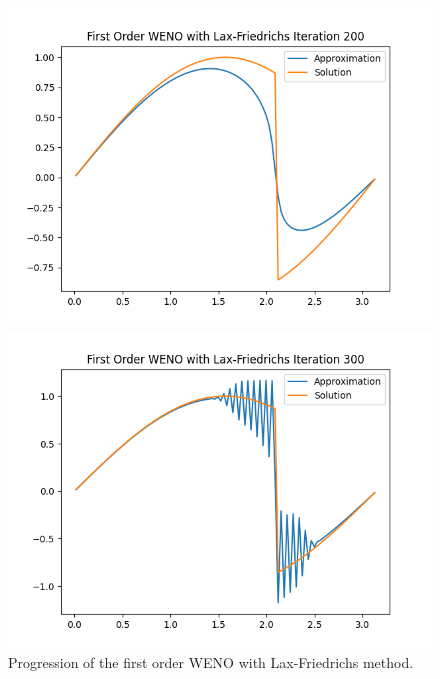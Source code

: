 \documentclass{article}
\begin{document}
\begin{figure}[t!]
\begin{minipage}{.48\textwidth}
    \end{minipage}
\par\bigskip
    \begin{minipage}{.48\textwidth}
        \centering
        \includegraphics[width=0.9\linewidth]{imgs/output_weno1_lf/plot_200.png}
    \end{minipage}%
    \begin{minipage}{.48\textwidth}
        \centering
        \includegraphics[width=0.9\linewidth]{imgs/output_weno1_lf/plot_300.png}
    \end{minipage}
\caption{Progression of the first order WENO with Lax-Friedrichs method.}
\end{figure}
\end{document}
